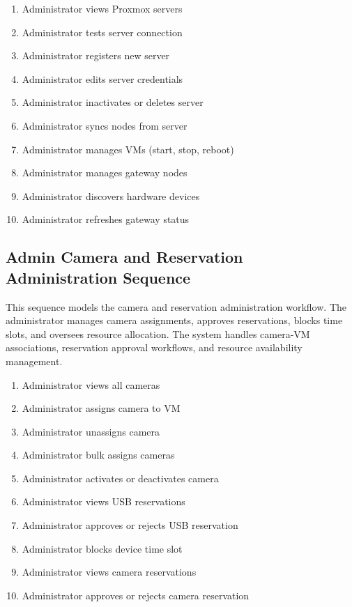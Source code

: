 \begin{enumerate}[topsep=0pt,itemsep=1pt,parsep=0pt,partopsep=0pt]
    \item Administrator views Proxmox servers
    \item Administrator tests server connection
    \item Administrator registers new server
    \item Administrator edits server credentials
    \item Administrator inactivates or deletes server
    \item Administrator syncs nodes from server
    \item Administrator manages VMs (start, stop, reboot)
    \item Administrator manages gateway nodes
    \item Administrator discovers hardware devices
    \item Administrator refreshes gateway status
\end{enumerate}


\subsection{Admin Camera and Reservation Administration Sequence}
This sequence models the camera and reservation administration workflow. The
administrator manages camera assignments, approves reservations, blocks time
slots, and oversees resource allocation. The system handles camera-VM
associations, reservation approval workflows, and resource availability
management.

\begin{enumerate}[topsep=0pt,itemsep=1pt,parsep=0pt,partopsep=0pt]
    \item Administrator views all cameras
    \item Administrator assigns camera to VM
    \item Administrator unassigns camera
    \item Administrator bulk assigns cameras
    \item Administrator activates or deactivates camera
    \item Administrator views USB reservations
    \item Administrator approves or rejects USB reservation
    \item Administrator blocks device time slot
    \item Administrator views camera reservations
    \item Administrator approves or rejects camera reservation
\end{enumerate}

